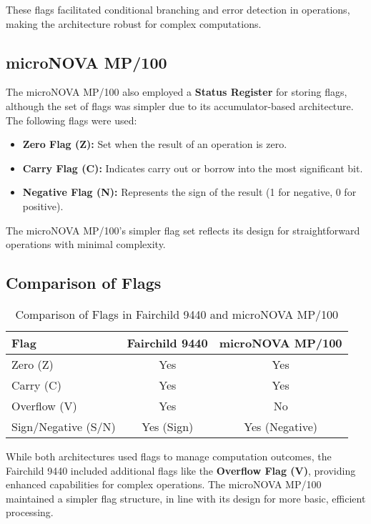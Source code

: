 \documentclass[a4paper,12pt]{article}
\begin{document}
These flags facilitated conditional branching and error detection in operations, making the architecture robust for complex computations.

\subsection{microNOVA MP/100}

The microNOVA MP/100 also employed a \textbf{Status Register} for storing flags, although the set of flags was simpler due to its accumulator-based architecture. The following flags were used:
\begin{itemize}
    \item \textbf{Zero Flag (Z):} Set when the result of an operation is zero.
    \item \textbf{Carry Flag (C):} Indicates carry out or borrow into the most significant bit.
    \item \textbf{Negative Flag (N):} Represents the sign of the result (1 for negative, 0 for positive).
\end{itemize}

The microNOVA MP/100’s simpler flag set reflects its design for straightforward operations with minimal complexity.

\subsection{Comparison of Flags}

\begin{table}[H]
\centering
\begin{tabular}{|l|c|c|}
\hline
\textbf{Flag}          & \textbf{Fairchild 9440} & \textbf{microNOVA MP/100} \\ \hline
Zero (Z)               & Yes                     & Yes                       \\ \hline
Carry (C)              & Yes                     & Yes                       \\ \hline
Overflow (V)           & Yes                     & No                        \\ \hline
Sign/Negative (S/N)    & Yes (Sign)              & Yes (Negative)            \\ \hline
\end{tabular}
\caption{Comparison of Flags in Fairchild 9440 and microNOVA MP/100}
\end{table}


While both architectures used flags to manage computation outcomes, the Fairchild 9440 included additional flags like the \textbf{Overflow Flag (V)}, providing enhanced capabilities for complex operations. The microNOVA MP/100 maintained a simpler flag structure, in line with its design for more basic, efficient processing.
\end{document}
